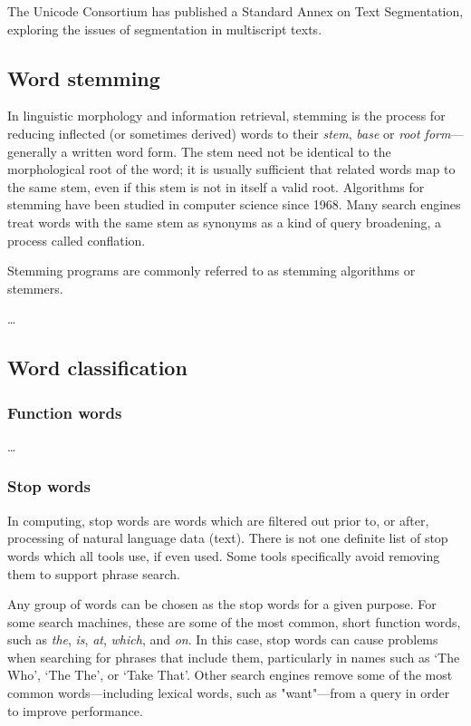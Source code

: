     The Unicode Consortium has published a Standard Annex\cite{Davis2012} on Text Segmentation, exploring the issues of segmentation in multiscript texts.
      

  \subsection{Word stemming}

    In linguistic morphology and information retrieval, stemming is the process for reducing inflected (or sometimes derived) words to their \emph{stem}, \emph{base} or \emph{root form}---generally a written word form. The stem need not be identical to the morphological root of the word; it is usually sufficient that related words map to the same stem, even if this stem is not in itself a valid root. Algorithms for stemming have been studied in computer science since 1968. Many search engines treat words with the same stem as synonyms as a kind of query broadening, a process called conflation.

    Stemming programs are commonly referred to as stemming algorithms or stemmers.      
    
    \ldots

  \subsection{Word classification}

    \subsubsection{Function words}
    
      \ldots
      
    \subsubsection{Stop words}

      In computing, stop words are words which are filtered out prior to, or after, processing of natural language data (text). There is not one definite list of stop words which all tools use, if even used. Some tools specifically avoid removing them to support phrase search.

      Any group of words can be chosen as the stop words for a given purpose. For some search machines, these are some of the most common, short function words, such as \emph{the}, \emph{is}, \emph{at}, \emph{which}, and \emph{on}. In this case, stop words can cause problems when searching for phrases that include them, particularly in names such as `The Who', `The The', or `Take That'. Other search engines remove some of the most common words—including lexical words, such as "want"—from a query in order to improve performance.

